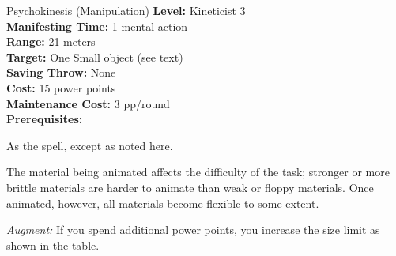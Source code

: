 {Psychokinesis (Manipulation)}
{
	\textbf{Level:}
	Kineticist 3\\
	\textbf{Manifesting Time:}
	1 mental action\\
	\textbf{Range:}
	21 meters\\
	\textbf{Target:}
	One Small object (see text)\\
	\textbf{Saving Throw:}
	None\\
	\textbf{Cost:}
	15 power points\\
	\textbf{Maintenance Cost:}
	3 pp/round\\
	\textbf{Prerequisites:}
	\\
}
{
	As the  spell, except as noted here.

	The material being animated affects the difficulty of the task; stronger or more brittle materials are harder to animate than weak or floppy materials. Once animated, however, all materials become flexible to some extent.


	\textit{Augment:} If you spend additional power points, you increase the size limit as shown in the table.
}